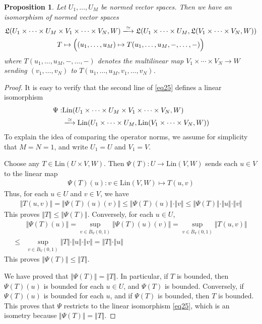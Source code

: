 \documentclass[12pt,b5paper,notitlepage]{article}
\theoremstyle{definition}
\theoremstyle{plain}
\newtheorem{pp}[df]{Proposition}
\newcommand{\fk}{\mathfrak}
\newcommand{\ovl}{\overline}
\newcommand{\Lin}{\mathrm{Lin}}
\numberwithin{equation}{section}
\begin{document}
\begin{pp}\label{lb40}
Let $U_1,\dots,U_M$ be normed vector spaces. Then we have an isomorphism of normed vector spaces
\begin{gather}\label{eq25}
\begin{gathered}
\fk L(U_1\times\cdots\times U_M\times V_1\times\cdots\times V_N,W)\xlongrightarrow{\simeq}\fk L(U_1\times\cdots\times U_M,\fk L(V_1\times\cdots\times V_N,W))\\
T\mapsto \Big((u_1,\dots,u_M)\mapsto T(u_1,\dots,u_M,-,\dots,-)\Big)
\end{gathered}
\end{gather}
where $T(u_1,\dots,u_M,-,\dots,-)$ denotes the multilinear map $V_1\times\cdots\times V_N\rightarrow W$ sending $(v_1,\dots,v_N)$ to $T(u_1,\dots,u_M,v_1,\dots,v_N)$.
\end{pp}

\begin{proof}
It is easy to verify that the second line of \eqref{eq25} defines a linear isomorphism
\begin{align*}
\Psi:&\Lin(U_1\times\cdots\times U_M\times V_1\times\cdots\times V_N,W)\\
&\xlongrightarrow{\simeq}\Lin(U_1\times\cdots\times U_M,\Lin(V_1\times\cdots\times V_N,W))
\end{align*}
To explain the idea of comparing the operator norms, we assume for simplicity that $M=N=1$, and write $U_1=U$ and $V_1=V$. 

Choose any $T\in\Lin(U\times V,W)$. Then $\Psi(T):U\rightarrow\Lin(V,W)$ sends each $u\in V$ to the linear map
\begin{align*}
\Psi(T)(u):v\in\Lin(V,W)\mapsto T(u,v)
\end{align*}
Thus, for each $u\in U$ and $v\in V$, we have
\begin{align*}
\Vert T(u,v)\Vert=\Vert \Psi(T)(u)(v)\Vert\leq \Vert \Psi(T)(u)\Vert\cdot \Vert v\Vert\leq\Vert\Psi(T)\Vert\cdot\Vert u\Vert\cdot\Vert v\Vert
\end{align*}
This proves $\Vert T\Vert\leq\Vert\Psi(T)\Vert$. Conversely, for each $u\in U$,
\begin{align*}
&\Vert \Psi(T)(u)\Vert=\sup_{v\in\ovl B_V(0,1)}\Vert\Psi(T)(u)(v)\Vert=\sup_{v\in\ovl B_V(0,1)}\Vert T(u,v)\Vert\\
\leq&\sup_{v\in\ovl B_V(0,1)}\Vert T\Vert\cdot\Vert u\Vert\cdot\Vert v\Vert=\Vert T\Vert\cdot\Vert u\Vert
\end{align*}
This proves $\Vert\Psi(T)\Vert\leq\Vert T\Vert$. 

We have proved that $\Vert\Psi(T)\Vert=\Vert T\Vert$. In particular, if $T$ is bounded, then $\Psi(T)(u)$ is bounded for each $u\in U$, and $\Psi(T)$ is bounded. Conversely, if $\Psi(T)(u)$ is bounded for each $u$, and if $\Psi(T)$ is bounded, then $T$ is bounded. This proves that $\Psi$ restricts to the linear isomorphism \eqref{eq25}, which is an isometry because $\Vert\Psi(T)\Vert=\Vert T\Vert$.
\end{proof}
\end{document}
